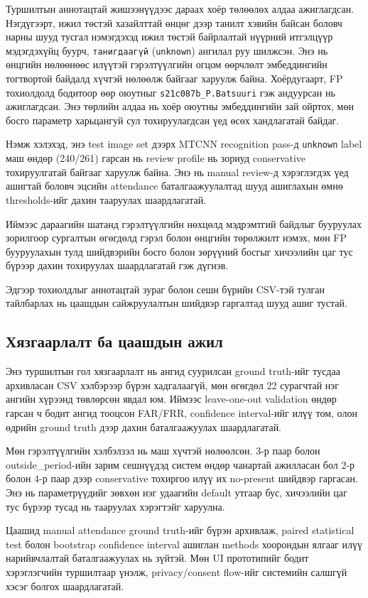 Туршилтын аннотацтай жишээнүүдээс дараах хоёр төлөөлөх алдаа ажиглагдсан. Нэгдүгээрт, ижил төстэй хазайлттай өнцөг дээр танилт хэвийн байсан боловч нарны шууд тусгал нэмэгдэхэд ижил төстэй байрлалтай нүүрний итгэлцүүр мэдэгдэхүйц буурч, \texttt{танигдаагүй} (\texttt{unknown}) ангилал руу шилжсэн. Энэ нь өнцгийн нөлөөнөөс илүүтэй гэрэлтүүлгийн огцом өөрчлөлт эмбеддингийн тогтвортой байдалд хүчтэй нөлөөлж байгааг харуулж байна. Хоёрдугаарт, FP тохиолдолд бодитоор өөр оюутныг \texttt{s21c087b\_P.Batsuuri} гэж андуурсан нь ажиглагдсан. Энэ төрлийн алдаа нь хоёр оюутны эмбеддингийн зай ойртох, мөн босго параметр харьцангуй сул тохируулагдсан үед өсөх хандлагатай байдаг.

Нэмж хэлэхэд, энэ test image set дээрх MTCNN recognition pass-д \texttt{unknown} label маш өндөр (240/261) гарсан нь review profile нь зориуд conservative тохируулгатай байгааг харуулж байна. Энэ нь manual review-д хэрэглэгдэх үед ашигтай боловч эцсийн attendance баталгаажуулалтад шууд ашиглахын өмнө thresholds-ийг дахин тааруулах шаардлагатай.

Иймээс дараагийн шатанд гэрэлтүүлгийн нөхцөлд мэдрэмтгий байдлыг бууруулах зорилгоор сургалтын өгөгдөлд гэрэл болон өнцгийн төрөлжилт нэмэх, мөн FP бууруулахын тулд шийдвэрийн босго болон зөрүүний босгыг хичээлийн цаг тус бүрээр дахин тохируулах шаардлагатай гэж дүгнэв.

Эдгээр тохиолдлыг аннотацтай зураг болон сешн бүрийн CSV-тэй тулган тайлбарлах нь цаашдын сайжруулалтын шийдвэр гаргалтад шууд ашиг тустай.

\subsection{Хязгаарлалт ба цаашдын ажил}
Энэ туршилтын гол хязгаарлалт нь ангид суурилсан ground truth-ийг тусдаа архивласан CSV хэлбэрээр бүрэн хадгалаагүй, мөн өгөгдөл 22 сурагчтай нэг ангийн хүрээнд төвлөрсөн явдал юм. Иймээс leave-one-out validation өндөр гарсан ч бодит ангид тооцсон FAR/FRR, confidence interval-ийг илүү том, олон өдрийн ground truth дээр дахин баталгаажуулах шаардлагатай.

Мөн гэрэлтүүлгийн хэлбэлзэл нь маш хүчтэй нөлөөлсөн. 3-р паар болон outside\_period-ийн зарим сешнүүдэд систем өндөр чанартай ажилласан бол 2-р болон 4-р паар дээр conservative тохиргоо илүү их no-present шийдвэр гаргасан. Энэ нь параметрүүдийг зөвхөн нэг удаагийн default утгаар бус, хичээлийн цаг тус бүрээр тусад нь тааруулах хэрэгтэйг харуулна.

Цаашид manual attendance ground truth-ийг бүрэн архивлаж, paired statistical test болон bootstrap confidence interval ашиглан methods хоорондын ялгааг илүү нарийвчлалтай баталгаажуулах нь зүйтэй. Мөн UI прототипийг бодит хэрэглэгчийн туршилтаар үнэлж, privacy/consent flow-ийг системийн салшгүй хэсэг болгох шаардлагатай.
\FloatBarrier
